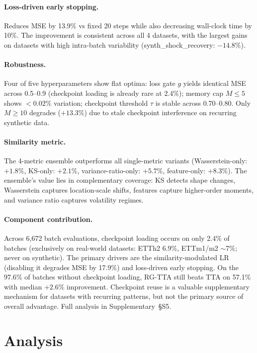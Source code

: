 \documentclass[journal]{IEEEtran}
\begin{document}
\paragraph{Loss-driven early stopping.} Reduces MSE by 13.9\% vs fixed 20 steps while also decreasing wall-clock time by 10\%. The improvement is consistent across all 4 datasets, with the largest gains on datasets with high intra-batch variability (synth\_shock\_recovery: $-14.8\%$).

\paragraph{Robustness.} Four of five hyperparameters show flat optima: loss gate $g$ yields identical MSE across 0.5--0.9 (checkpoint loading is already rare at 2.4\%); memory cap $M \leq 5$ shows $<0.02\%$ variation; checkpoint threshold $\tau$ is stable across 0.70--0.80. Only $M \geq 10$ degrades ($+13.3\%$) due to stale checkpoint interference on recurring synthetic data.

\paragraph{Similarity metric.} The 4-metric ensemble outperforms all single-metric variants (Wasserstein-only: $+1.8\%$, KS-only: $+2.1\%$, variance-ratio-only: $+5.7\%$, feature-only: $+8.3\%$). The ensemble's value lies in complementary coverage: KS detects shape changes, Wasserstein captures location-scale shifts, features capture higher-order moments, and variance ratio captures volatility regimes.

\paragraph{Component contribution.} Across 6{,}672 batch evaluations, checkpoint loading occurs on only 2.4\% of batches (exclusively on real-world datasets: ETTh2 6.9\%, ETTm1/m2 $\sim$7\%; never on synthetic). The primary drivers are the similarity-modulated LR (disabling it degrades MSE by 17.9\%) and loss-driven early stopping. On the 97.6\% of batches without checkpoint loading, RG-TTA still beats TTA on 57.1\% with median $+2.6\%$ improvement. Checkpoint reuse is a valuable supplementary mechanism for datasets with recurring patterns, but not the primary source of overall advantage. Full analysis in Supplementary~\S{S5}.


\section{Analysis}
\label{sec:analysis}
\end{document}
